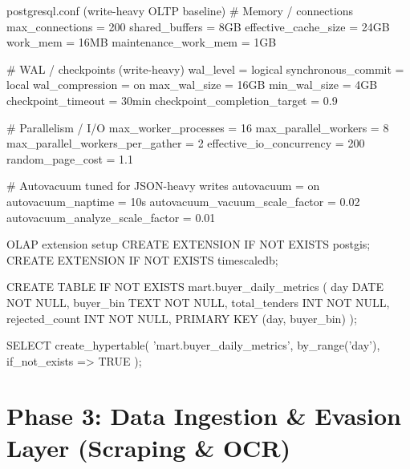 \documentclass[11pt,a4paper]{article}
\begin{document}
\begin{codeblock}[language={}]{postgresql.conf (write-heavy OLTP baseline)}
# Memory / connections
max_connections = 200
shared_buffers = 8GB
effective_cache_size = 24GB
work_mem = 16MB
maintenance_work_mem = 1GB

# WAL / checkpoints (write-heavy)
wal_level = logical
synchronous_commit = local
wal_compression = on
max_wal_size = 16GB
min_wal_size = 4GB
checkpoint_timeout = 30min
checkpoint_completion_target = 0.9

# Parallelism / I/O
max_worker_processes = 16
max_parallel_workers = 8
max_parallel_workers_per_gather = 2
effective_io_concurrency = 200
random_page_cost = 1.1

# Autovacuum tuned for JSON-heavy writes
autovacuum = on
autovacuum_naptime = 10s
autovacuum_vacuum_scale_factor = 0.02
autovacuum_analyze_scale_factor = 0.01
\end{codeblock}

\begin{codeblock}[language=SQL]{OLAP extension setup}
CREATE EXTENSION IF NOT EXISTS postgis;
CREATE EXTENSION IF NOT EXISTS timescaledb;

CREATE TABLE IF NOT EXISTS mart.buyer_daily_metrics (
    day DATE NOT NULL,
    buyer_bin TEXT NOT NULL,
    total_tenders INT NOT NULL,
    rejected_count INT NOT NULL,
    PRIMARY KEY (day, buyer_bin)
);

SELECT create_hypertable(
    'mart.buyer_daily_metrics',
    by_range('day'),
    if_not_exists => TRUE
);
\end{codeblock}

\section{Phase 3: Data Ingestion \& Evasion Layer (Scraping \& OCR)}
\end{document}
